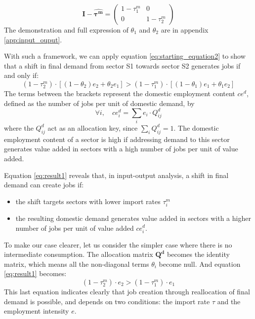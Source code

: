 $$ \pmb{I} - \pmb{\widehat{\tau^m}} =
\begin{pmatrix} 
1-\tau^m_1 & 0\\
0 & 1-\tau^m_2
\end{pmatrix}
$$
The demonstration and full expression of $\theta_1$ and $\theta_2$ are in appendix \ref{app:input_ouput}. 

With such a framework, we can apply equation \ref{eq:starting_equation2} to show that a shift in final demand from sector S1 towards sector S2 generates jobs if and only if:
\begin{equation}
\label{eq:result1}
(1-\tau^m_2) \cdot \left[(1-\theta_2)e_2 + \theta_2 e_1 \right]> (1-\tau^m_1) \cdot \left[ (1-\theta_1)e_1 + \theta_1 e_2 \right]
\end{equation}
The terms between the brackets represent the domestic employment content  $ce^d$, defined as the number of jobs per unit of domestic demand, by 
$$\forall i, \quad ce^d_i = \sum_i e_i \cdot Q^d_{ij}$$
where the $Q^d_{ij}$ act as an allocation key, since $\sum_i Q^d_{ij}= 1$.
The domestic employment content of a sector is high if addressing demand to this sector generates value added in sectors with a high number of jobs per unit of value added.

Equation \ref{eq:result1} reveals that, in input-output analysis, a shift in final demand can create jobs if:
\begin{itemize}
	\item the shift targets sectors with lower import rates $\tau^m_i$
	\item the resulting domestic demand generates value added in sectors with a higher number of jobs per unit of value added $ce^d_i$. 
\end{itemize}	

To make our case clearer, let us consider the simpler case where there is no intermediate consumption. The allocation matrix $\pmb{Q^d}$ becomes the identity matrix, which means all the non-diagonal terms $\theta_i$ become null. And equation \ref{eq:result1} becomes:
\begin{equation}
(1-\tau^m_2) \cdot e_2 > (1-\tau^m_1) \cdot e_1
\label{eq:result1_simplified}
\end{equation}
This last equation indicates clearly that job creation through reallocation of final demand is possible, and depends on two conditions: the import rate $\tau$ and the employment intensity $e$. 

